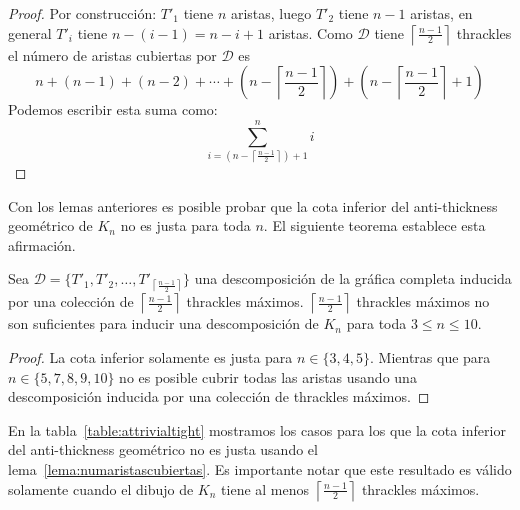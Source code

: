  \begin{proof}
   Por construcción: $T'_1$ tiene $n$ aristas, luego $T'_2$ tiene $n-1$ aristas, en general $T'_i$ tiene
   $n-(i-1) = n-i+1$ aristas. Como $\mathcal{D}$ tiene $\left\lceil\frac{n-1}{2}\right\rceil$ thrackles
   el número de aristas cubiertas por $\mathcal{D}$ es \[ n + (n-1) + (n-2) + \cdots + (n-\left\lceil\frac{n-1}{2}\right\rceil) +
   (n - \left\lceil\frac{n-1}{2}\right\rceil + 1)\]
   Podemos escribir esta suma como:
   \[\displaystyle \sum^n_{i=\left(n-\left\lceil\frac{n-1}{2}\right\rceil\right) + 1}i\]
 \end{proof}
%

Con los lemas anteriores es posible probar que la cota inferior del anti-thickness geométrico
de $K_n$ no es justa para toda $n$. El siguiente teorema establece esta afirmación.
\begin{theorem}\label{teo:cotainf}
Sea $\mathcal{D}=\{T'_1,T'_2,\dots,T'_{\left\lceil\frac{n-1}{2}\right\rceil}\}$ una descomposición
de la gráfica completa inducida por una colección de $\left\lceil\frac{n-1}{2}\right\rceil$ thrackles máximos.
$\left\lceil\frac{n-1}{2}\right\rceil$ thrackles máximos no son
suficientes para inducir una descomposición de $K_n$ para toda $3 \leq n \leq 10$.
\end{theorem}
\begin{proof}
  La cota inferior solamente es justa para $n\in\{3,4,5\}$. Mientras que para $n\in \{5,7,8,9,10\}$
  no es posible cubrir todas las aristas usando una descomposición inducida por una colección
  de thrackles máximos.
\end{proof}
En la tabla~\ref{table:attrivialtight} mostramos los casos para los que la cota
inferior del anti-thickness geométrico no es justa usando el lema~\ref{lema:numaristascubiertas}.
Es importante notar que este resultado es válido solamente cuando el dibujo de $K_n$ tiene al menos
$\left\lceil\frac{n-1}{2}\right\rceil$ thrackles máximos.

